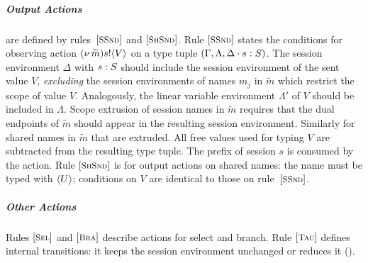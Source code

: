 \documentclass[a4paper,UKenglish]{lipics}
\theoremstyle{definition}
\begin{document}
\subparagraph{Output Actions} are defined by rules~$\eltsrule{SSnd}$
and $\eltsrule{ShSnd}$.  
Rule $\eltsrule{SSnd}$ states the conditions for observing action
$(\nu\, \widetilde{m}) s ! \langle V \rangle$ on a type tuple 
$(\Gamma, \Lambda, \Delta\cdot s : S)$. 
The session environment $\Delta$ with $s : S$ 
should include the session environment of the sent value $V$, 
{\em excluding} the session environments of names $m_j$ 
in $\widetilde{m}$ which restrict the scope of value $V$. 
Analogously, the linear variable environment 
$\Lambda'$ of $V$ should be included in $\Lambda$. 
Scope extrusion of session names in $\widetilde{m}$ requires
that the dual endpoints of $\widetilde{m}$ should appear in
the resulting session environment. Similarly for shared 
names in $\widetilde{m}$ that are extruded.  
All free values used for typing $V$ are subtracted from the
resulting type tuple. The prefix of session $s$ is consumed
by the action.
Rule $\eltsrule{ShSnd}$ is for output actions on shared names:
the name must be typed with $\langle U \rangle$; conditions on $V$ are identical to those
on rule~$\eltsrule{SSnd}$.

\subparagraph{Other Actions}
Rules $\eltsrule{Sel}$ and $\eltsrule{Bra}$ describe actions for
select and branch.
Rule $\eltsrule{Tau}$ defines
internal transitions: 
it keeps the session environment unchanged or 
reduces it ().

\end{document}
